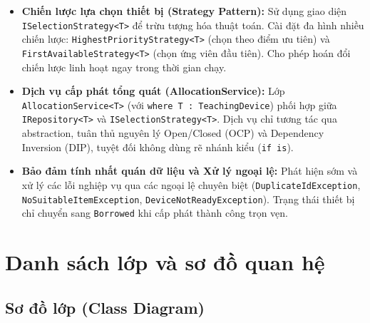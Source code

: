 \documentclass[11pt,a4paper]{article}
\begin{document}
\begin{itemize}[itemsep=2.5pt]
    \item \textbf{Chiến lược lựa chọn thiết bị (Strategy Pattern):} Sử dụng giao diện \texttt{ISelectionStrategy<T>} để trừu tượng hóa thuật toán. Cài đặt đa hình nhiều chiến lược: \texttt{HighestPriorityStrategy<T>} (chọn theo điểm ưu tiên) và \texttt{FirstAvailableStrategy<T>} (chọn ứng viên đầu tiên). Cho phép hoán đổi chiến lược linh hoạt ngay trong thời gian chạy.

    \item \textbf{Dịch vụ cấp phát tổng quát (AllocationService):} Lớp \texttt{AllocationService<T>} (với \texttt{where T : TeachingDevice}) phối hợp giữa \texttt{IRepository<T>} và \texttt{ISelectionStrategy<T>}. Dịch vụ chỉ tương tác qua abstraction, tuân thủ nguyên lý Open/Closed (OCP) và Dependency Inversion (DIP), tuyệt đối không dùng rẽ nhánh kiểu (\texttt{if is}).

    \item \textbf{Bảo đảm tính nhất quán dữ liệu và Xử lý ngoại lệ:} Phát hiện sớm và xử lý các lỗi nghiệp vụ qua các ngoại lệ chuyên biệt (\texttt{DuplicateIdException}, \texttt{NoSuitableItemException}, \texttt{DeviceNotReadyException}). Trạng thái thiết bị chỉ chuyển sang \texttt{Borrowed} khi cấp phát thành công trọn vẹn.
\end{itemize}

\newpage

\section{Danh sách lớp và sơ đồ quan hệ}

\subsection{Sơ đồ lớp (Class Diagram)}
\end{document}
